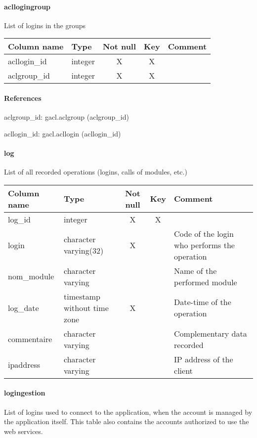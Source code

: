 \paragraph{acllogingroup}
List of logins in the groups

\begin{tabular}{|l| p{2cm}|c|c| p{5cm}|}
\hline
Column name & Type & Not null & Key & Comment \\
\hline
acllogin\_id & integer & X & X & \\
aclgroup\_id & integer & X & X & \\
\hline
\end{tabular}
\paragraph{References}
aclgroup\_id: gacl.aclgroup (aclgroup\_id)

acllogin\_id: gacl.acllogin (acllogin\_id)

\paragraph{log}
List of all recorded operations (logins, calls of modules, etc.)

\begin{tabular}{|l| p{2cm}|c|c| p{5cm}|}
\hline
Column name & Type & Not null & Key & Comment \\
\hline
log\_id & integer & X & X & \\
login & character varying(32) & X &  & Code of the login who performs the operation\\
nom\_module & character varying &  &  & Name of the performed module\\
log\_date & timestamp without time zone & X &  & Date-time of the operation\\
commentaire & character varying &  &  & Complementary data recorded\\
ipaddress & character varying &  &  & IP address of the client\\
\hline
\end{tabular}
\paragraph{logingestion}
List of logins used to connect to the application, when the account is managed by the application itself. This table also contains the accounts authorized to use the web services.

